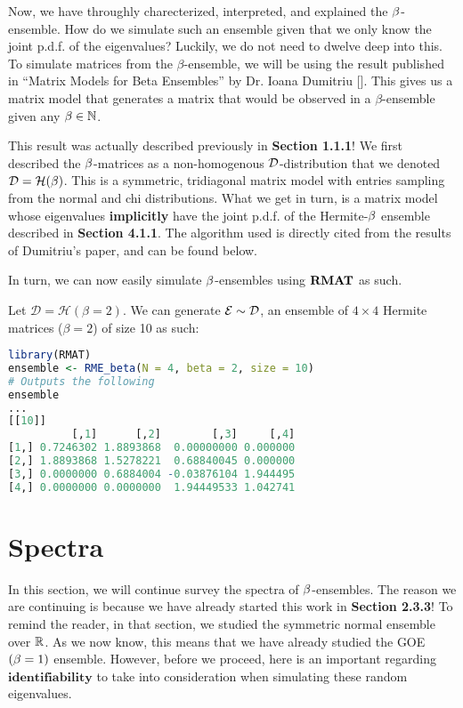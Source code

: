 Now, we have throughly charecterized, interpreted, and explained the $\beta$-ensemble.
How do we simulate such an ensemble given that we only know the joint p.d.f. of the eigenvalues?
Luckily, we do not need to dwelve deep into this. To simulate matrices from the $\beta$-ensemble, we will be using the result published in ``Matrix Models for Beta Ensembles'' by Dr. Ioana Dumitriu [\cite{dumitriu}].
This gives us a matrix model that generates a matrix that would be observed in a $\beta$-ensemble given any $\beta \in \mathbb{N}$.


This result was actually described previously in \textbf{Section 1.1.1}! We first described the $\beta$-matrices as a non-homogenous $\mathcal{D}$-distribution that we denoted $\mathcal{D} = \mathcal{H}(\beta)$. This is a symmetric, tridiagonal matrix model with entries sampling from the normal and chi distributions. What we get in turn, is a matrix model whose eigenvalues \textbf{implicitly} have the joint p.d.f. of the Hermite-$\beta$ ensemble described in \textbf{Section 4.1.1}. The algorithm used is directly cited from the results of Dumitriu's paper, and can be found below.

\ALGbeta

In turn, we can now easily simulate $\beta$-ensembles using ${\textbf{RMAT}}$ as such.

\begin{code}[Hermite Beta = 2 Ensemble]
Let $\mathcal{D} = \mathcal{H}(\beta = 2)$. We can generate $\mathcal{E} \sim \mathcal{D}$, an ensemble of $4 \times 4$ Hermite matrices ($\beta = 2$) of size 10 as such:
\end{code}

\begin{lstlisting}[language=R]
library(RMAT)
ensemble <- RME_beta(N = 4, beta = 2, size = 10)
# Outputs the following
ensemble
...
[[10]]
          [,1]      [,2]        [,3]     [,4]
[1,] 0.7246302 1.8893868  0.00000000 0.000000
[2,] 1.8893868 1.5278221  0.68840045 0.000000
[3,] 0.0000000 0.6884004 -0.03876104 1.944495
[4,] 0.0000000 0.0000000  1.94449533 1.042741
\end{lstlisting}

\newpage
\section{Spectra}

In this section, we will continue survey the spectra of $\beta$-ensembles. The reason we are continuing is because we have already started this work in \textbf{Section 2.3.3}!
To remind the reader, in that section, we studied the symmetric normal ensemble over $\mathbb{R}$. As we now know, this means that we have already studied the GOE $(\beta = 1)$ ensemble.
However, before we proceed, here is an important regarding $\textbf{identifiability}$ to take into consideration when simulating these random eigenvalues.

